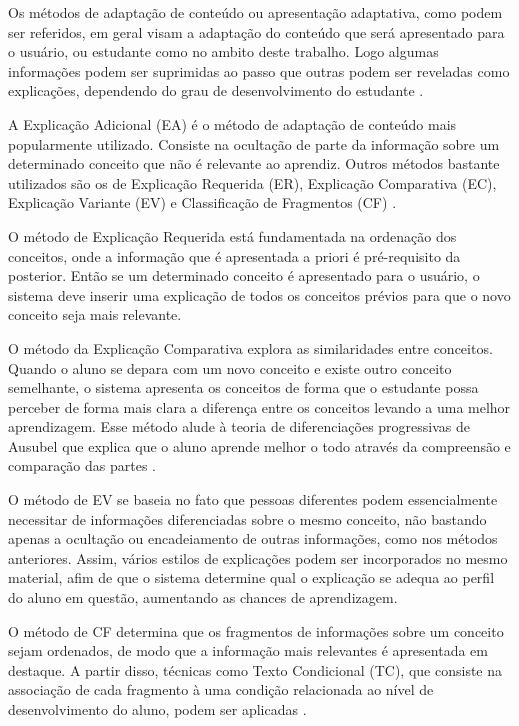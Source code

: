 Os métodos de adaptação de conteúdo ou apresentação adaptativa, como podem ser referidos, em geral visam a adaptação do conteúdo que será apresentado para o usuário, ou estudante como no ambito deste trabalho. Logo algumas informações podem ser suprimidas ao passo que outras podem ser reveladas como explicações, dependendo do grau de desenvolvimento do estudante \cite{brusilovsky1996, fragelli2010, diniz2012}.

A Explicação Adicional (EA) é o método de adaptação de conteúdo mais popularmente utilizado. Consiste na ocultação de parte da informação sobre um determinado conceito que não é relevante ao aprendiz. Outros métodos bastante utilizados são os de Explicação Requerida (ER), Explicação Comparativa (EC), Explicação Variante (EV) e Classificação de Fragmentos (CF) \cite{brusilovsky1996, fragelli2010}. 

O método de Explicação Requerida está fundamentada na ordenação dos conceitos, onde a informação que é apresentada a priori é pré-requisito da posterior. Então se um determinado conceito é apresentado para o usuário, o sistema deve inserir uma explicação de todos os conceitos prévios para que o novo conceito seja mais relevante.

O método da Explicação Comparativa explora as similaridades entre conceitos. Quando o aluno se depara com um novo conceito e existe outro conceito semelhante, o sistema apresenta os conceitos de forma que o estudante possa perceber de forma mais clara a diferença entre os conceitos levando a uma melhor aprendizagem. Esse método alude à teoria de diferenciações progressivas de Ausubel que explica que o aluno aprende melhor o todo através da compreensão e comparação das partes \cite{brusilovsky1998, ausubel2000}.

O método de EV se baseia no fato que pessoas diferentes podem essencialmente necessitar de informações diferenciadas sobre o mesmo conceito, não bastando apenas a ocultação ou encadeiamento de outras informações, como nos métodos anteriores. Assim, vários estilos de explicações podem ser incorporados no mesmo material, afim de que o sistema determine qual o explicação se adequa ao perfil do aluno em questão, aumentando as chances de aprendizagem.

O método de CF determina que os fragmentos de informações sobre um conceito sejam ordenados, de modo que a informação mais relevantes é apresentada em destaque. A partir disso, técnicas como Texto Condicional (TC), que consiste na associação de cada fragmento à uma condição relacionada ao nível de desenvolvimento do aluno, podem ser aplicadas \cite{brusilovsky1996}.

